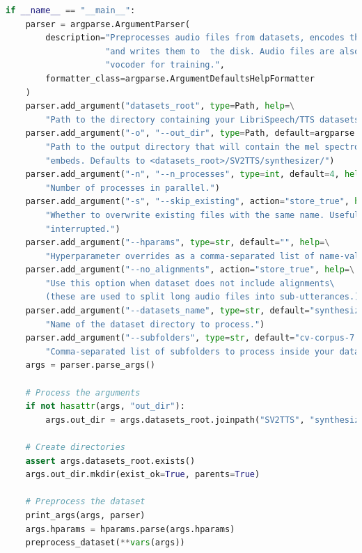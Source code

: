 \begin{enumerate}
\begin{lstlisting}[language=Python, caption=Training Speaker Encoder Model]
if __name__ == "__main__":
    parser = argparse.ArgumentParser(
        description="Preprocesses audio files from datasets, encodes them as mel spectrograms "
                    "and writes them to  the disk. Audio files are also saved, to be used by the "
                    "vocoder for training.",
        formatter_class=argparse.ArgumentDefaultsHelpFormatter
    )
    parser.add_argument("datasets_root", type=Path, help=\
        "Path to the directory containing your LibriSpeech/TTS datasets.")
    parser.add_argument("-o", "--out_dir", type=Path, default=argparse.SUPPRESS, help=\
        "Path to the output directory that will contain the mel spectrograms, the audios and the "
        "embeds. Defaults to <datasets_root>/SV2TTS/synthesizer/")
    parser.add_argument("-n", "--n_processes", type=int, default=4, help=\
        "Number of processes in parallel.")
    parser.add_argument("-s", "--skip_existing", action="store_true", help=\
        "Whether to overwrite existing files with the same name. Useful if the preprocessing was "
        "interrupted.")
    parser.add_argument("--hparams", type=str, default="", help=\
        "Hyperparameter overrides as a comma-separated list of name-value pairs")
    parser.add_argument("--no_alignments", action="store_true", help=\
        "Use this option when dataset does not include alignments\
        (these are used to split long audio files into sub-utterances.)")
    parser.add_argument("--datasets_name", type=str, default="synthesizer_dataset", help=\
        "Name of the dataset directory to process.")
    parser.add_argument("--subfolders", type=str, default="cv-corpus-7.0-2021-07-21", help=\
        "Comma-separated list of subfolders to process inside your dataset directory")
    args = parser.parse_args()

    # Process the arguments
    if not hasattr(args, "out_dir"):
        args.out_dir = args.datasets_root.joinpath("SV2TTS", "synthesizer")

    # Create directories
    assert args.datasets_root.exists()
    args.out_dir.mkdir(exist_ok=True, parents=True)

    # Preprocess the dataset
    print_args(args, parser)
    args.hparams = hparams.parse(args.hparams)
    preprocess_dataset(**vars(args))
    
\end{lstlisting}


\end{enumerate}
